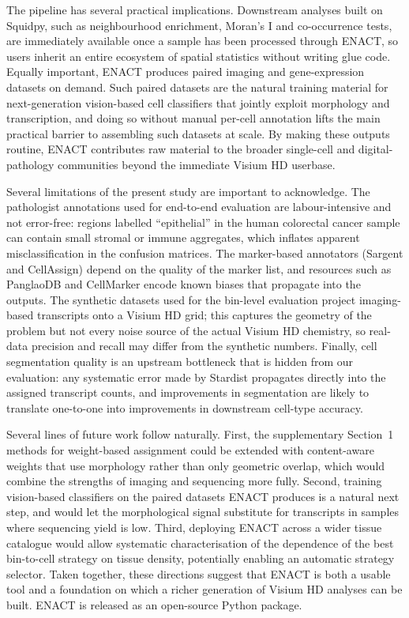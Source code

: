 \documentclass[11pt]{article}
\begin{document}
The pipeline has several practical implications. Downstream analyses built on Squidpy, such as neighbourhood enrichment, Moran's I and co-occurrence tests, are immediately available once a sample has been processed through ENACT, so users inherit an entire ecosystem of spatial statistics without writing glue code. Equally important, ENACT produces paired imaging and gene-expression datasets on demand. Such paired datasets are the natural training material for next-generation vision-based cell classifiers that jointly exploit morphology and transcription, and doing so without manual per-cell annotation lifts the main practical barrier to assembling such datasets at scale. By making these outputs routine, ENACT contributes raw material to the broader single-cell and digital-pathology communities beyond the immediate Visium HD userbase.

Several limitations of the present study are important to acknowledge. The pathologist annotations used for end-to-end evaluation are labour-intensive and not error-free: regions labelled ``epithelial'' in the human colorectal cancer sample can contain small stromal or immune aggregates, which inflates apparent misclassification in the confusion matrices. The marker-based annotators (Sargent and CellAssign) depend on the quality of the marker list, and resources such as PanglaoDB and CellMarker encode known biases that propagate into the outputs. The synthetic datasets used for the bin-level evaluation project imaging-based transcripts onto a Visium HD grid; this captures the geometry of the problem but not every noise source of the actual Visium HD chemistry, so real-data precision and recall may differ from the synthetic numbers. Finally, cell segmentation quality is an upstream bottleneck that is hidden from our evaluation: any systematic error made by Stardist propagates directly into the assigned transcript counts, and improvements in segmentation are likely to translate one-to-one into improvements in downstream cell-type accuracy.

Several lines of future work follow naturally. First, the supplementary Section~1 methods for weight-based assignment could be extended with content-aware weights that use morphology rather than only geometric overlap, which would combine the strengths of imaging and sequencing more fully. Second, training vision-based classifiers on the paired datasets ENACT produces is a natural next step, and would let the morphological signal substitute for transcripts in samples where sequencing yield is low. Third, deploying ENACT across a wider tissue catalogue would allow systematic characterisation of the dependence of the best bin-to-cell strategy on tissue density, potentially enabling an automatic strategy selector. Taken together, these directions suggest that ENACT is both a usable tool and a foundation on which a richer generation of Visium HD analyses can be built. ENACT is released as an open-source Python package.



\end{document}
